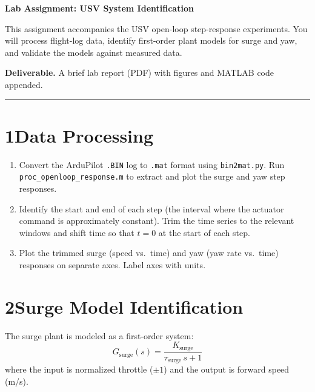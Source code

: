 \documentclass[11pt]{article}
\begin{document}
\begin{center}
  \Large{\bf{Lab Assignment: USV System Identification}}
\end{center}

This assignment accompanies the USV open-loop step-response experiments.
You will process flight-log data, identify first-order plant models for surge and
yaw, and validate the models against measured data.

\textbf{Deliverable.}  A brief lab report (PDF) with figures and MATLAB code
appended.

\bigskip\hrule\bigskip

\section*{1\quad Data Processing}

\begin{enumerate}

\item Convert the ArduPilot \texttt{.BIN} log to \texttt{.mat} format using
  \texttt{bin2mat.py}.  Run \texttt{proc\_openloop\_response.m} to extract and
  plot the surge and yaw step responses.

\item Identify the start and end of each step (the interval where the actuator
  command is approximately constant).  Trim the time series to the relevant
  windows and shift time so that $t = 0$ at the start of each step.

\item Plot the trimmed surge (speed vs.\ time) and yaw (yaw rate vs.\ time)
  responses on separate axes.  Label axes with units.

\end{enumerate}

\section*{2\quad Surge Model Identification}

The surge plant is modeled as a first-order system:
\[
  G_{\mathrm{surge}}(s) = \frac{K_{\mathrm{surge}}}{\tau_{\mathrm{surge}}\,s + 1}
\]
where the input is normalized throttle ($\pm 1$) and the output is forward speed (m/s).
\end{document}
